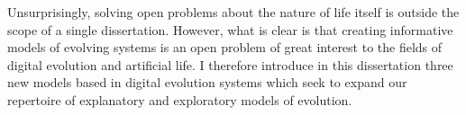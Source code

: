 Unsurprisingly, solving open problems about the nature of life itself is outside the scope of a single dissertation. 
However, what is clear is that creating informative models of evolving systems is an open problem of great interest to the fields of digital evolution and artificial life. 
I therefore introduce in this dissertation three new models based in digital evolution systems which seek to expand our repertoire of explanatory and exploratory models of evolution.